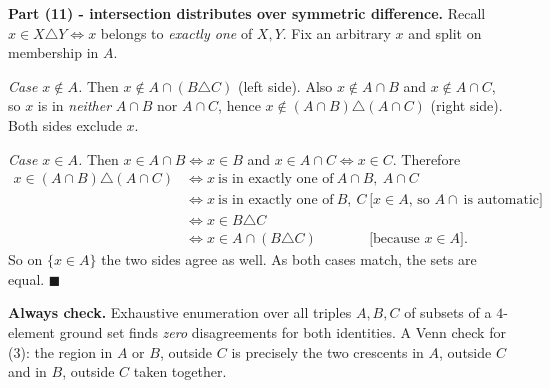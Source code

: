 \documentclass[11pt,a4paper]{article}
\newcommand{\symd}{\triangle}          %
\begin{document}
\textbf{Part (11) - intersection distributes over symmetric difference.}
Recall $x\in X\symd Y\iff x$ belongs to \emph{exactly one} of $X,Y$. Fix an arbitrary $x$ and split
on membership in $A$.

\emph{Case $x\notin A$.} Then $x\notin A\cap(B\symd C)$ (left side). Also $x\notin A\cap B$ and
$x\notin A\cap C$, so $x$ is in \emph{neither} $A\cap B$ nor $A\cap C$, hence
$x\notin(A\cap B)\symd(A\cap C)$ (right side). Both sides exclude $x$. \checkmark

\emph{Case $x\in A$.} Then $x\in A\cap B\iff x\in B$ and $x\in A\cap C\iff x\in C$. Therefore
\begin{align*}
x\in(A\cap B)\symd(A\cap C)
&\iff x\ \text{is in exactly one of}\ A\cap B,\ A\cap C\\
&\iff x\ \text{is in exactly one of}\ B,\ C &&\text{[}x\in A\text{, so }A\cap\ \text{is automatic]}\\
&\iff x\in B\symd C\\
&\iff x\in A\cap(B\symd C) &&\text{[because }x\in A\text{].}
\end{align*}
So on $\{x\in A\}$ the two sides agree as well. As both cases match, the sets are equal.
$\blacksquare$

\textbf{Always check.} Exhaustive enumeration over all triples $A,B,C$ of subsets of a $4$-element
ground set finds \emph{zero} disagreements for both identities. A Venn check for (3): the region
\textquotedbl{}in $A$ or $B$, outside $C$\textquotedbl{} is precisely the two crescents
\textquotedbl{}in $A$, outside $C$\textquotedbl{} and \textquotedbl{}in $B$, outside
$C$\textquotedbl{} taken together. \checkmark

\begin{center}
\end{center}
\end{document}
